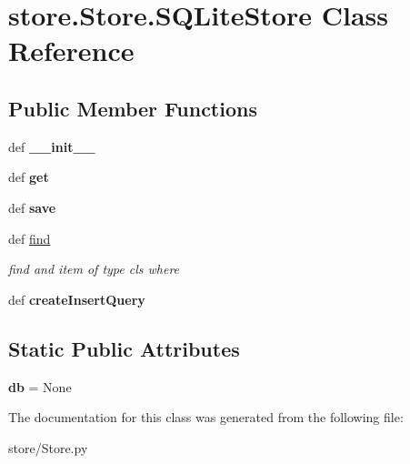 \hypertarget{classstore_1_1_store_1_1_s_q_lite_store}{\section{store.\-Store.\-S\-Q\-Lite\-Store Class Reference}
\label{classstore_1_1_store_1_1_s_q_lite_store}
}
\subsection*{Public Member Functions}
\begin{DoxyCompactItemize}
\item 
\hypertarget{classstore_1_1_store_1_1_s_q_lite_store_a007e6b708dacb48c4d0b0ddaec7df28c}{def {\bfseries \-\_\-\-\_\-init\-\_\-\-\_\-}}\label{classstore_1_1_store_1_1_s_q_lite_store_a007e6b708dacb48c4d0b0ddaec7df28c}

\item 
\hypertarget{classstore_1_1_store_1_1_s_q_lite_store_a2c265207a658772856f9d322af5e4848}{def {\bfseries get}}\label{classstore_1_1_store_1_1_s_q_lite_store_a2c265207a658772856f9d322af5e4848}

\item 
\hypertarget{classstore_1_1_store_1_1_s_q_lite_store_a5c5bbac644cd2457d02be525ffbf6669}{def {\bfseries save}}\label{classstore_1_1_store_1_1_s_q_lite_store_a5c5bbac644cd2457d02be525ffbf6669}

\item 
\hypertarget{classstore_1_1_store_1_1_s_q_lite_store_a2d29ac35f67f1e29160ff8d7a6cf2d4e}{def \hyperlink{classstore_1_1_store_1_1_s_q_lite_store_a2d29ac35f67f1e29160ff8d7a6cf2d4e}{find}}\label{classstore_1_1_store_1_1_s_q_lite_store_a2d29ac35f67f1e29160ff8d7a6cf2d4e}

\begin{DoxyCompactList}\small\item\em find and item of type cls where \end{DoxyCompactList}\item 
\hypertarget{classstore_1_1_store_1_1_s_q_lite_store_a02f2b71123ddb656b9fc558229a7f530}{def {\bfseries create\-Insert\-Query}}\label{classstore_1_1_store_1_1_s_q_lite_store_a02f2b71123ddb656b9fc558229a7f530}

\end{DoxyCompactItemize}
\subsection*{Static Public Attributes}
\begin{DoxyCompactItemize}
\item 
\hypertarget{classstore_1_1_store_1_1_s_q_lite_store_a15742f03d65865e047de6cf63e1affbd}{{\bfseries db} = None}\label{classstore_1_1_store_1_1_s_q_lite_store_a15742f03d65865e047de6cf63e1affbd}

\end{DoxyCompactItemize}


The documentation for this class was generated from the following file\-:\begin{DoxyCompactItemize}
\item 
store/Store.\-py\end{DoxyCompactItemize}
